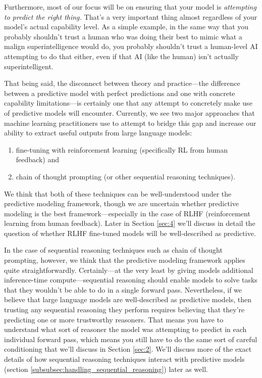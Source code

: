 \documentclass[
  onecolumn,
  nonatbib,
]{miri-tech-article}
\begin{document}
Furthermore, most of our focus will be on ensuring that your model is \textit{attempting to predict the right thing.} That's a very important thing almost regardless of your model's actual capability level. As a simple example, in the same way that you probably shouldn't trust a human who was doing their best to mimic what a malign superintelligence would do, you probably shouldn't trust a human-level AI attempting to do that either, even if that AI (like the human) isn't actually superintelligent.

That being said, the disconnect between theory and practice---the difference between a predictive model with perfect predictions and one with concrete capability limitations---is certainly one that any attempt to concretely make use of predictive models will encounter. Currently, we see two major approaches that machine learning practitioners use to attempt to bridge this gap and increase our ability to extract useful outputs from large language models:



\begin{enumerate}
\item fine-tuning with reinforcement learning\cite{deep_RL_human_pref} (specifically RL from human feedback) and
\item chain of thought prompting\cite{chain_of_thought} (or other sequential reasoning techniques).
\end{enumerate}

We think that both of these techniques can be well-understood under the predictive modeling framework, though we are uncertain whether predictive modeling is the best framework---especially in the case of RLHF (reinforcement learning from human feedback). Later in Section \ref{sec:4} we'll discuss in detail the question of whether RLHF fine-tuned models will be well-described as predictive.

In the case of sequential reasoning techniques such as chain of thought prompting, however, we think that the predictive modeling framework applies quite straightforwardly. Certainly---at the very least by giving models additional inference-time compute---sequential reasoning should enable models to solve tasks that they wouldn't be able to do in a single forward pass. Nevertheless, if we believe that large language models are well-described as predictive models, then trusting any sequential reasoning they perform requires believing that they're predicting one or more trustworthy reasoners. That means you have to understand what sort of reasoner the model was attempting to predict in each individual forward pass, which means you still have to do the same sort of careful conditioning that we'll discuss in Section \ref{sec:2}. We'll discuss more of the exact details of how sequential reasoning techniques interact with predictive models (section \ref{subsubsec:handling_sequential_reasoning}) later as well.
\end{document}
